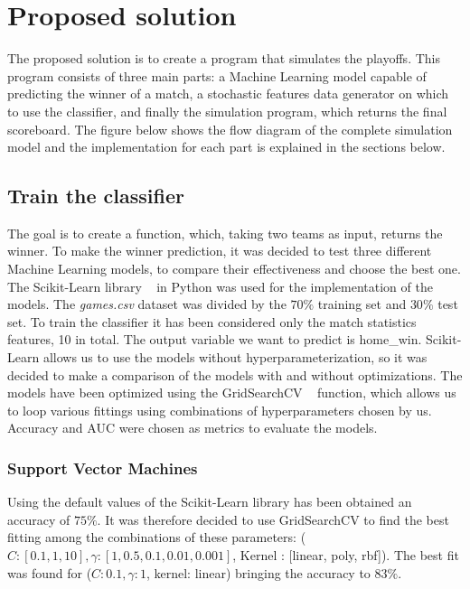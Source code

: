 \documentclass{article}
\begin{document}
\section{Proposed solution}
\label{section: ProposedaSolution}
The proposed solution is to create a program that simulates the playoffs. This program consists of three main parts: a Machine Learning model capable of predicting the winner of a match, a stochastic features data generator on which to use the classifier, and finally the simulation program, which returns the final scoreboard. The figure below shows the flow diagram of the complete simulation model and the implementation for each part is explained in the sections below.
\begin{figure}[h!]
\centering
{} \quad
\label{fig:simulationModel}
\end{figure}
\subsection{Train the classifier}
The goal is to create a function, which, taking two teams as input, returns the winner. To make the winner prediction, it was decided to test three different Machine Learning models, to compare their effectiveness and choose the best one. The Scikit-Learn library ~\cite{Scikit-Learn} in Python was used for the implementation of the models. The \emph{games.csv} dataset was divided by the $70\%$ training set and $30\%$ test set. To train the classifier it has been considered only the match statistics features, 10 in total. The output variable we want to predict is home\_win. Scikit-Learn allows us to use the models without hyperparameterization, so it was decided to make a comparison of the models with and without optimizations. The models have been optimized using the GridSearchCV ~\cite{GridSearchCV} function, which allows us to loop various fittings using combinations of hyperparameters chosen by us. Accuracy and AUC were chosen as metrics to evaluate the models.
\subsubsection{Support Vector Machines}
Using the default values ​​of the Scikit-Learn library  has been obtained an accuracy of $75\%$. It was therefore decided to use GridSearchCV to find the best fitting among the combinations of these parameters: ($C: [0.1, 1, 10], \gamma : [1, 0.5, 0.1, 0.01, 0.001]$, Kernel : [linear, poly, rbf]). The best fit was found for ($C: 0.1, \gamma: 1$, kernel: linear) bringing the accuracy to $83\%$.
\end{document}
